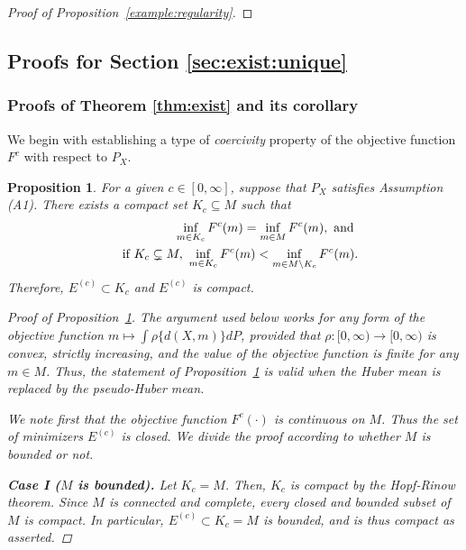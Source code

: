 \documentclass[preprint]{imsart}
\theoremstyle{plain}
\newtheorem{proposition}{Proposition}
\theoremstyle{remark}
\begin{document}
\begin{appendix}
\begin{proof}[Proof of Proposition~\ref{example:regularity}]
\end{proof}


\subsection{Proofs for Section \ref{sec:exist:unique}}



\subsubsection{Proofs of Theorem \ref{thm:exist} and its corollary}

We begin with establishing a type of \textit{coercivity} property of the objective function $F^{c}$ with respect to $P_{X}$. 

\begin{proposition}\label{prop:cpt}
For a given $c \in [0, \infty]$, suppose that $P_{X}$ satisfies Assumption (A1). There exists a compact set $K_{c} \subseteq M$ such that 
\begin{eqnarray}\label{coercive}
\centering
&& \inf_{m \in K_{c}} F^{c}(m) = \inf_{m \in M} F^{c}(m), ~ \mbox{and} ~ \nonumber \\
&& \mbox{if} ~ K_{c} \subsetneq M, ~  \inf_{m \in K_{c}} F^{c}(m) < \inf_{m \in M \setminus K_{c}} F^{c}(m). 
\end{eqnarray}
Therefore, $E^{(c)}\subset K_{c}$ and $E^{(c)}$ is compact.
\begin{proof}[Proof of Proposition~\ref{prop:cpt}]

The argument used below works for any form of the objective function $m \mapsto \int \rho \{ d(X,m)\} dP$, provided that $\rho: [0,\infty) \to [0,\infty)$ is convex, strictly increasing, and the value of the objective function is finite for any $m \in M$. Thus, the statement of Proposition~\ref{prop:cpt} is valid when the Huber mean is replaced by the pseudo-Huber mean.




We note first that the objective function $F^c(\cdot)$ is continuous on $M$. Thus the set of minimizers $E^{(c)}$ is closed. 
We divide the proof according to whether $M$ is bounded or not.

\textbf{Case I ($M$ is bounded).} Let $K_{c}= M$. Then, $K_{c}$ is compact by the Hopf-Rinow theorem. Since $M$ is connected and complete, every closed and bounded subset of $M$ is compact. In particular, $E^{(c)} \subset K_{c} = M$ is bounded, and is thus compact as asserted.    


\end{proof}
\end{proposition}
\end{appendix}
\end{document}
